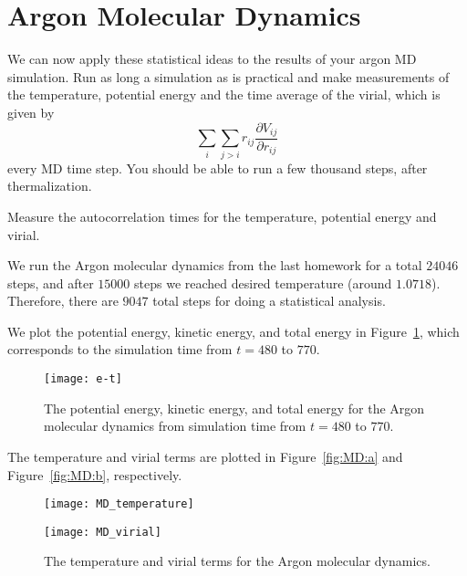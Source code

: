 \section{Argon Molecular Dynamics}

We can now apply these statistical ideas to the results of your argon MD simulation. Run as
long a simulation as is practical and make measurements of the temperature, potential energy
and the time average of the virial, which is given by
%
\begin{equation}
    \sum_i \sum_{j > i} r_{ij} \frac{ \partial V_{ij} }{ \partial r_{ij} }
\end{equation}
%
every MD time step. You should be able to run a few thousand steps, after thermalization.


 Measure the autocorrelation times for the temperature, potential energy and
virial.

\Answer{}
We run the Argon molecular dynamics from the last homework for a total \(24046\) steps,
and after \(15000\) steps we reached desired temperature (around \(1.0718\)).
Therefore, there are \(9047\) total steps for doing a statistical analysis.

We plot the potential energy, kinetic energy, and total energy in Figure~\ref{fig:MD_e_t},
which corresponds to the simulation time from \(t = 480\) to \(770\).

\begin{figure}[hb]
    \centering
    \texttt{[image: e-t]}
    \caption{The potential energy, kinetic energy, and total energy for the
        Argon molecular dynamics from simulation time from \(t = 480\) to \(770\).}
    \label{fig:MD_e_t}
\end{figure}

The temperature and virial terms are plotted in
Figure~\ref{fig:MD:a} and Figure~\ref{fig:MD:b}, respectively.

\begin{figure}[H]
    \centering
    \begin{minipage}[t]{0.8\linewidth}
        \centering
        \texttt{[image: MD\_temperature]}
        \label{fig:MD:a}
    \end{minipage}
    \hfill
    \begin{minipage}[t]{0.8\linewidth}
        \centering
        \texttt{[image: MD\_virial]}
        \label{fig:MD:b}
    \end{minipage}
    \caption{The temperature and virial terms for the
        Argon molecular dynamics.}
    \label{fig:MD}
\end{figure}

